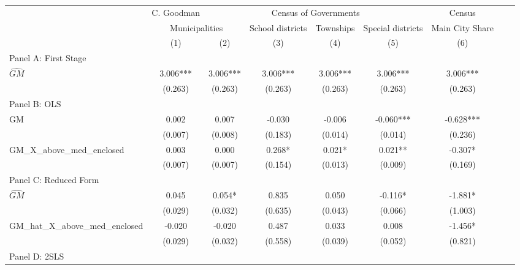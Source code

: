  \begin{tabular}{l*{8}{c}} \toprule
&\multicolumn{1}{c}{C. Goodman}&\multicolumn{4}{c}{Census of Governments}&\multicolumn{1}{c}{Census}\\\cmidrule(lr){2-2}\cmidrule(lr){3-6}\cmidrule(lr){7-7}
&\multicolumn{2}{c}{Municipalities}&\multicolumn{1}{c}{School districts}&\multicolumn{1}{c}{Townships}&\multicolumn{1}{c}{Special districts}&\multicolumn{1}{c}{Main City Share}\\\cmidrule(lr){2-3}\cmidrule(lr){4-6}\cmidrule(lr){7-7}
&\multicolumn{1}{c}{(1)}&\multicolumn{1}{c}{(2)}&\multicolumn{1}{c}{(3)}&\multicolumn{1}{c}{(4)}&\multicolumn{1}{c}{(5)}&\multicolumn{1}{c}{(6)}\\
\cmidrule(lr){1-7}
\multicolumn{6}{l}{Panel A: First Stage}\\
\cmidrule(lr){1-7}
$\widehat{GM}$  &    3.006***&    3.006***&    3.006***&    3.006***&    3.006***&    3.006***\\
                &  (0.263)   &  (0.263)   &  (0.263)   &  (0.263)   &  (0.263)   &  (0.263)   \\
\cmidrule(lr){1-7}
\multicolumn{6}{l}{Panel B: OLS}\\
\cmidrule(lr){1-7}
GM              &    0.002   &    0.007   &   -0.030   &   -0.006   &   -0.060***&   -0.628***\\
                &  (0.007)   &  (0.008)   &  (0.183)   &  (0.014)   &  (0.014)   &  (0.236)   \\
\addlinespace
GM\_X\_above\_med\_enclosed&    0.003   &    0.000   &    0.268*  &    0.021*  &    0.021** &   -0.307*  \\
                &  (0.007)   &  (0.007)   &  (0.154)   &  (0.013)   &  (0.009)   &  (0.169)   \\
\cmidrule(lr){1-7}
\multicolumn{6}{l}{Panel C: Reduced Form}\\
\cmidrule(lr){1-7}
$\widehat{GM}$  &    0.045   &    0.054*  &    0.835   &    0.050   &   -0.116*  &   -1.881*  \\
                &  (0.029)   &  (0.032)   &  (0.635)   &  (0.043)   &  (0.066)   &  (1.003)   \\
\addlinespace
GM\_hat\_X\_above\_med\_enclosed&   -0.020   &   -0.020   &    0.487   &    0.033   &    0.008   &   -1.456*  \\
                &  (0.029)   &  (0.032)   &  (0.558)   &  (0.039)   &  (0.052)   &  (0.821)   \\
\cmidrule(lr){1-7}
\multicolumn{6}{l}{Panel D: 2SLS}\\

\end{tabular}
